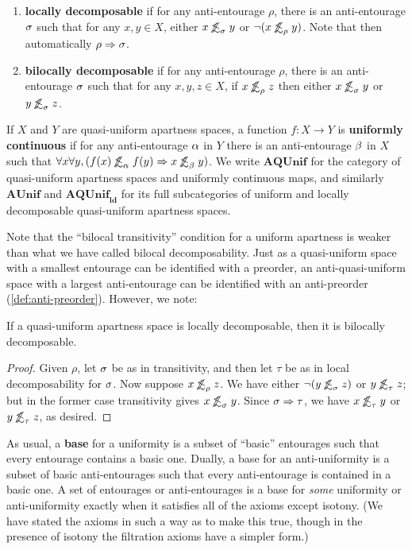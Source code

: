 \documentclass{article}
\def\oapt{\mathrel{\!\not\,\not\lesssim}}
\def\aent#1{\oapt_{#1}}
\let\implies\Rightarrow
\def\nn{\ensuremath{\neg\neg}}
\def\AUnif{\mathbf{AUnif}}
\def\AUnifnn{\mathbf{AUnif}_{\nn}}
\def\AQUnif{\mathbf{AQUnif}}
\def\AUnifnn{\mathbf{AUnif}_{\nn}}
\def\ldAQUnif{\mathbf{AQUnif}_{\mathbf{ld}}}
\begin{document}
\begin{defn}
\begin{enumerate}[resume]
  \item \textbf{locally decomposable} if for any anti-entourage $\rho$, there is an anti-entourage $\sigma$ such that for any $x,y\in X$, either $x\aent\si y$ or $\neg(x\aent\rho y)$.
    Note that then automatically $\rho\implies\si$.
  \item \textbf{bilocally decomposable} if for any anti-entourage $\rho$, there is an anti-entourage $\sigma$ such that for any $x,y,z\in X$, if $x\aent\rho z$ then either $x\aent\si y$ or $y\aent\si z$.
  \end{enumerate}
  If $X$ and $Y$ are quasi-uniform apartness spaces, a function $f:X\to Y$ is \textbf{uniformly continuous} if for any anti-entourage $\alpha$ in $Y$ there is an anti-entourage $\beta$ in $X$ such that $\forall x\forall y, (f(x)\aent\al f(y) \implies x\aent\be y)$.
  We write $\AQUnif$ for the category of quasi-uniform apartness spaces and uniformly continuous maps, and similarly $\AUnif$ %
  and $\ldAQUnif$ for its full subcategories of uniform %
  and locally decomposable quasi-uniform apartness spaces.
\end{defn}

Note that the ``bilocal transitivity'' condition for a uniform apartness is weaker than what we have called bilocal decomposability.
Just as a quasi-uniform space with a smallest entourage can be identified with a preorder, an anti-quasi-uniform space with a largest anti-entourage can be identified with an anti-preorder (\cref{def:anti-preorder}).
However, we note:

\begin{lem}
  If a quasi-uniform apartness space is locally decomposable, then it is bilocally decomposable.
\end{lem}
\begin{proof}
  Given $\rho$, let $\sigma$ be as in transitivity, and then let $\tau$ be as in local decomposability for $\sigma$.
  Now suppose $x\aent\rho z$.
  We have either $\neg(y\aent\si z)$ or $y\aent\tau z$; but in the former case transitivity gives $x\aent\si y$.
  Since $\si\implies\tau$, we have $x\aent\tau y$ or $y\aent\tau z$, as desired.
\end{proof}

As usual, a \textbf{base} for a uniformity is a subset of ``basic'' entourages such that every entourage contains a basic one.
Dually, a base for an anti-uniformity is a subset of basic anti-entourages such that every anti-entourage is contained in a basic one.
A set of entourages or anti-entourages is a base for \emph{some} uniformity or anti-uniformity exactly when it satisfies all of the axioms except isotony.
(We have stated the axioms in such a way as to make this true, though in the presence of isotony the filtration axioms have a simpler form.)
\end{document}
